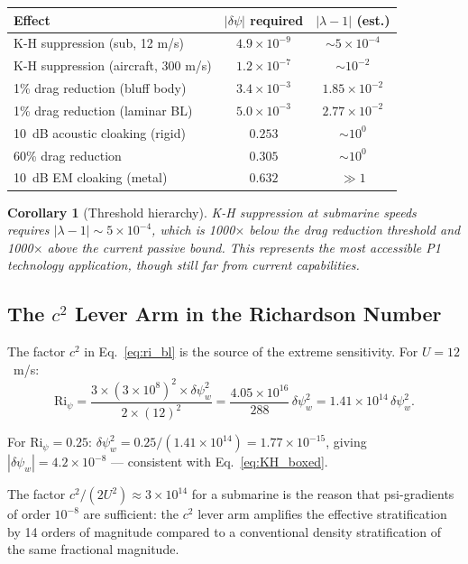 \documentclass[11pt,twocolumn]{article}
\newcommand{\dpsi}{\delta\psi}
\newcommand{\lam}{\lambda}
\newcommand{\Ri}{\mathrm{Ri}}
\newtheorem{corollary}{Corollary}
\begin{document}
\begin{center}
\begin{tabular}{@{}lcc@{}}
\toprule
\textbf{Effect} & $|\dpsi|$ required & $|\lam-1|$ (est.) \\
\midrule
K-H suppression (sub, 12 m/s) & $4.9\times10^{-9}$ & $\sim 5\times10^{-4}$ \\
K-H suppression (aircraft, 300 m/s) & $1.2\times10^{-7}$ & $\sim 10^{-2}$ \\
1\% drag reduction (bluff body) & $3.4\times10^{-3}$ & $1.85\times10^{-2}$ \\
1\% drag reduction (laminar BL) & $5.0\times10^{-3}$ & $2.77\times10^{-2}$ \\
10~dB acoustic cloaking (rigid) & $0.253$ & $\sim 10^0$ \\
60\% drag reduction & $0.305$ & $\sim 10^0$ \\
10~dB EM cloaking (metal) & $0.632$ & $\gg 1$ \\
\bottomrule
\end{tabular}
\end{center}

\begin{corollary}[Threshold hierarchy]
K-H suppression at submarine speeds requires $|\lam-1| \sim 5\times10^{-4}$,
which is 1000$\times$ below the drag reduction threshold and 1000$\times$
above the current passive bound. This represents the most accessible P1
technology application, though still far from current capabilities.
\end{corollary}

\subsection{The $c^2$ Lever Arm in the Richardson Number}

The factor $c^2$ in Eq.~\eqref{eq:ri_bl} is the source of the extreme
sensitivity. For $U = 12$~m/s:
\begin{equation}
\Ri_\psi = \frac{3\times(3\times10^8)^2\times\dpsi_w^2}
{2\times(12)^2}
= \frac{4.05\times10^{16}}{288}\,\dpsi_w^2
= 1.41\times10^{14}\,\dpsi_w^2.
\end{equation}

For $\Ri_\psi = 0.25$: $\dpsi_w^2 = 0.25/(1.41\times10^{14}) = 1.77\times10^{-15}$,
giving $|\dpsi_w| = 4.2\times10^{-8}$ --- consistent with
Eq.~\eqref{eq:KH_boxed}.

The factor $c^2/(2U^2) \approx 3\times10^{14}$ for a submarine is the
reason that psi-gradients of order $10^{-8}$ are sufficient: the $c^2$
lever arm amplifies the effective stratification by 14 orders of magnitude
compared to a conventional density stratification of the same fractional
magnitude.
\end{document}
